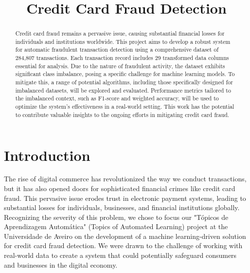 \documentclass[conference]{IEEEtran}
\begin{document}
\title{Credit Card Fraud Detection\\}

\author{
\and
{}
}

\maketitle

\begin{abstract}
Credit card fraud remains a pervasive issue, causing substantial financial losses for individuals and institutions worldwide. This project aims to develop a robust system for automatic fraudulent transaction detection using a comprehensive dataset of 284,807 transactions. Each transaction record includes 29 transformed data columns essential for analysis. Due to the nature of fraudulent activity, the dataset exhibits significant class imbalance, posing a specific challenge for machine learning models. To mitigate this, a range of potential algorithms, including those specifically designed for imbalanced datasets, will be explored and evaluated.  Performance metrics tailored to the imbalanced context, such as F1-score and weighted accuracy, will be used to optimize the system's effectiveness in a real-world setting. This work has the potential to contribute valuable insights to the ongoing efforts in mitigating credit card fraud.
\end{abstract}

\section{Introduction}
The rise of digital commerce has revolutionized the way we conduct transactions, but it has also opened doors for sophisticated financial crimes like credit card fraud. This pervasive issue erodes trust in electronic payment systems, leading to substantial losses for individuals, businesses, and financial institutions globally. Recognizing the severity of this problem, we chose to focus our "Tópicos de Aprendizagem Automática" (Topics of Automated Learning) project at the Universidade de Aveiro on the development of a machine learning-driven solution for credit card fraud detection. We were drawn to the challenge of working with real-world data to create a system that could potentially safeguard consumers and businesses in the digital economy.
\end{document}
